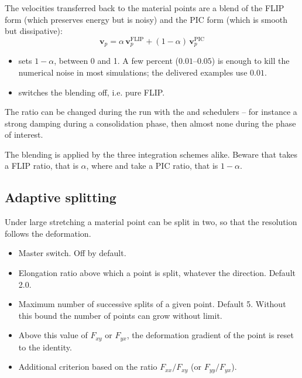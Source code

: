 \documentclass[a4paper,onecolumn,11pt]{doofus}
\newcommand{\syntaxml}[1]{%
  \par\noindent
  \colorbox{backcolour}{%
    \parbox{\dimexpr\linewidth-2\fboxsep-2\fboxrule\relax}{%
      \ttfamily\small\raggedright #1}}%
  \par
}
\begin{document}
The velocities transferred back to the material points are a blend of the FLIP form (which
preserves energy but is noisy) and the PIC form (which is smooth but dissipative):
\begin{equation}
  \bm{v}_p = \alpha \, \bm{v}_p^{\text{FLIP}} + (1-\alpha) \, \bm{v}_p^{\text{PIC}}
\end{equation}

\begin{itemize}
\item {} sets $1-\alpha$, between 0
      and 1. A few percent ($0.01$--$0.05$) is enough to kill the numerical noise in most
      simulations; the delivered examples use $0.01$.
\item {} switches the blending off, i.e. pure FLIP.
\end{itemize}

The ratio can be changed during the run with the  and
 schedulers -- for instance a strong damping during a
consolidation phase, then almost none during the phase of interest.

The blending is applied by the three integration schemes alike. Beware that
 takes a FLIP ratio, that is $\alpha$, where  and
 take a PIC ratio, that is $1-\alpha$.

\subsection{Adaptive splitting}
\label{sec:splitting}

Under large stretching a material point can be split in two, so that the resolution follows the
deformation.

\begin{itemize}
\item {} Master switch. Off by default.
\item {} Elongation ratio above
      which a point is split, whatever the direction. Default 2.0.
\item {} Maximum number of successive splits
      of a given point. Default 5. Without this bound the number of points can grow without
      limit.
\item {} Above this value of $F_{xy}$ or
      $F_{yx}$, the deformation gradient of the point is reset to the identity.
\item \syntaxml{ \param{active} \type{(double)}\param{maxRatio}}
      Additional criterion based on the ratio $F_{xx}/F_{xy}$ (or $F_{yy}/F_{yx}$).
\end{itemize}
\end{document}
